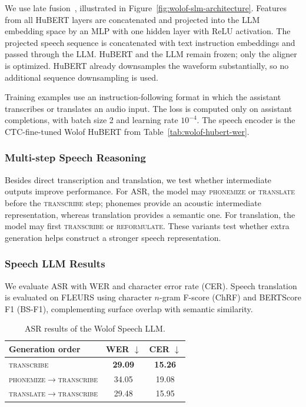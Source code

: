 We use late fusion~\citep{llava,llamaspeech}, illustrated in Figure~\ref{fig:wolof-slm-architecture}. Features from all HuBERT layers are concatenated and projected into the LLM embedding space by an MLP with one hidden layer with ReLU activation. The projected speech sequence is concatenated with text instruction embeddings and passed through the LLM. HuBERT and the LLM remain frozen; only the aligner is optimized. HuBERT already downsamples the waveform substantially, so no additional sequence downsampling is used.

Training examples use an instruction-following format in which the assistant transcribes or translates an audio input. The loss is computed only on assistant completions, with batch size 2 and learning rate \(10^{-4}\). The speech encoder is the CTC-fine-tuned Wolof HuBERT from Table~\ref{tab:wolof-hubert-wer}.

\subsubsection{Multi-step Speech Reasoning}

Besides direct transcription and translation, we test whether intermediate outputs improve performance. For ASR, the model may \textsc{phonemize} or \textsc{translate} before the \textsc{transcribe} step; phonemes provide an acoustic intermediate representation, whereas translation provides a semantic one. For translation, the model may first \textsc{transcribe} or \textsc{reformulate}. These variants test whether extra generation helps construct a stronger speech representation.

\subsubsection{Speech LLM Results}

We evaluate ASR with WER and character error rate (CER). Speech translation is evaluated on FLEURS using character \(n\)-gram F-score (ChRF) and BERTScore F1 (BS-F1), complementing surface overlap with semantic similarity.

\begin{table}[ht]
    \centering
    \begin{tabular}{lcc}
        \toprule
        \textbf{Generation order} & \textbf{WER \(\downarrow\)} & \textbf{CER \(\downarrow\)} \\
        \midrule
        \textsc{transcribe} & \textbf{29.09} & \textbf{15.26} \\
        \textsc{phonemize}\(\rightarrow\)\textsc{transcribe} & 34.05 & 19.08 \\
        \textsc{translate}\(\rightarrow\)\textsc{transcribe} & 29.48 & 15.95 \\
        \bottomrule
    \end{tabular}
    \caption{ASR results of the Wolof Speech LLM.}
    \label{tab:wolof-slm-asr}
\end{table}


